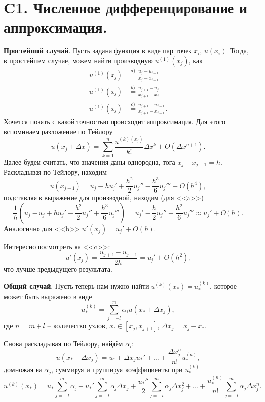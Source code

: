 \section{C1. Численное дифференцирование и аппроксимация.}


\textbf{Простейший случай}.
Пусть задана функция в виде пар точек $x_i,\, u(x_i)$. Тогда, в простейшем случае, можем найти производную $u^{(1)} (x_j)$, как
\begin{align*}
    u^{(1)} (x_j) &\overset{a)}{=}  \frac{u_j - u_{j-1}}{x_j - x_{j-1}} \\
    u^{(1)} (x_j) &\overset{b)}{=} \frac{u_{j+1}-u_{j}}{x_{j+1}-x_j} \\
    u^{(1)} (x_j) &\overset{c)}{=} \frac{u_{j+1}-u_{j-1}}{x_{j+1}-x_{j-1}}.
\end{align*}
Хочется понять с какой точностью происходит аппроксимация. Для этого вспоминаем разложение по Тейлору
\begin{equation*}
    u(x_j + \Delta x) = \sum_{k=1}^{n} \frac{u^{(k) (x_j)}}{k!} \Delta x^k + O\left(\Delta x^{n+1}\right).
\end{equation*}
Далее будем считать, что  значения даны однородна, тога $x_j - x_{j-1} = h$. Раскладывая по Тейлору, находим
\begin{equation*}
    u(x_{j-1}) = u_j - h u_j' + \frac{h^2}{2}u_j'' - \frac{h^3}{6} u_j''' + O(h^4),
\end{equation*}
подставляя в выражение для производной, находим (для <<a>>)
\begin{equation*}
    \frac{1}{h}\left(
        u_j - u_j + h u_j' - \frac{h^2}{2} u_j'' + \frac{h^3}{6} u_j'''
    \right) = u_j' - \frac{h}{2} u_j'' + \frac{h^2}{6} u_j''' \approx u_j' + O(h).
\end{equation*}
Аналогично для <<b>> $u'(x_j) = u_j' + O(h)$.

Интересно посмотреть на <<c>>:
\begin{equation*}
    u'(x_j) = \frac{u_{j+1}-u_{j-1}}{2 h} = u_j' + O(h^2),
\end{equation*}
что лучше предыдущего результата.


\textbf{Общий случай}. Пусть теперь нам нужно найти $u^{(k)} (x_*) = u_*^{(k)}$, которое может быть выражено в виде
\begin{equation*}
     u_*^{(k)} = \sum_{j=-l}^{m} \alpha_i u(x_* + \Delta x_j),
\end{equation*}
где $n = m + l$ -- количество узлов, $x_* \in [x_j, x_{j+1}]$, $\Delta x_j = x_j-x_*$.

Снова раскладывая по Тейлору, найдём $\alpha_i$:
\begin{equation*}
    u(x_* + \Delta x_j) = u_* + \Delta x_j u_*' + \ldots + \frac{\Delta x_j^n}{n!} u^{(n)}_*,
\end{equation*}
домножая на $\alpha_j$, суммируя и группируя коэффициенты при $u_*^{(k)}$
\begin{equation*}
    u^{(k)}(x_*) = u_* \sum_{j=-l}^{m} \alpha_j + u_*' \sum_{j=-l}^{m} \alpha_j \Delta x_j + \frac{u_*''}{2} \sum_{j=-l}^{m} \alpha_j \Delta x_j^2 + \ldots
     + \frac{u_*^{(n)}}{n!} \sum_{j=-l}^{m} \alpha_j \Delta x_j^n.
\end{equation*}

